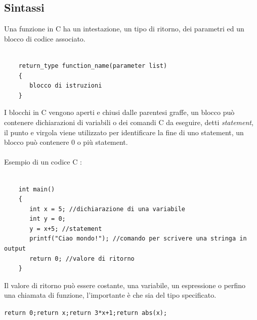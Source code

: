 \documentclass[12pt, letterpaper]{article}
\newcommand{\code}[1]{\colorbox{light-gray}{\texttt{#1}}}
\newcommand{\acc}{\\\hphantom{}\\}
\begin{document}
\subsection{Sintassi}
Una funzione in C ha un intestazione, un tipo di ritorno, dei parametri ed un blocco di codice associato.
\begin{lstlisting}[style=CStyle]
    
    return_type function_name(parameter list)
    {
       blocco di istruzioni
    }
    \end{lstlisting}
I blocchi in C vengono aperti e chiusi dalle parentesi graffe, un blocco può contenere 
dichiarazioni di variabili o dei comandi C da eseguire, detti \textit{statement}, il punto e virgola viene 
utilizzato per identificare la fine di uno statement, un blocco può contenere 0 o più statement.\acc 
Esempio di un codice C :
\begin{lstlisting}[style=CStyle]

    int main()
    {
       int x = 5; //dichiarazione di una variabile 
       int y = 0;
       y = x+5; //statement 
       printf("Ciao mondo!"); //comando per scrivere una stringa in output 
       return 0; //valore di ritorno
    }
    \end{lstlisting}
Il valore di ritorno può essere costante, una variabile, un espressione o perfino una chiamata di funzione, l'importante 
è che sia del tipo specificato.\begin{center}
    \code{return 0;}\hphantom{text}\code{return x;}\hphantom{text}\code{return 3*x+1;}\hphantom{text}\code{return abs(x);}
\end{center}
\end{document}
